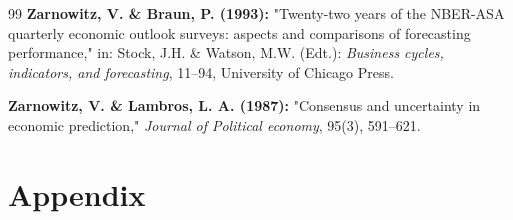 \documentclass[12pt,a4paper]{article}
\begin{document}
\begin{thebibliography}{99}
	\textbf{Zarnowitz, V. \& Braun, P. (1993):}
	"Twenty-two years of the NBER-ASA quarterly economic outlook surveys: aspects and comparisons of forecasting performance,"
	in: Stock, J.H. \& Watson, M.W. (Edt.):
	\emph{Business cycles, indicators, and forecasting}, 11--94, University of Chicago Press.
	
	\textbf{Zarnowitz, V. \& Lambros, L. A. (1987):}
	"Consensus and uncertainty in economic prediction,"
	\emph{Journal of Political economy}, 95(3), 591--621.
	
	
	
\end{thebibliography}

\cleardoublepage{} %
\setcounter{table}{0}\setcounter{figure}{0}\setcounter{equation}{0}\setcounter{subsection}{0}
\renewcommand{\thesubsection}{A.\arabic{subsection}}
\renewcommand{\thetable}{A\arabic{table}}
\renewcommand{\thefigure}{A\arabic{figure}}
\renewcommand{\theequation}{A\arabic{equation}}

\section*{Appendix}


		
		
		
		
		
		\clearpage
		\thispagestyle{empty}\mbox{}
		\clearpage
		

	
\end{document}
